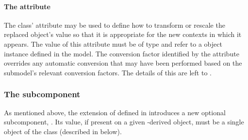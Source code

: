 %


\paragraph{The \fixttspace{} attribute}
\label{replacedelement-conversionfactor}

The \ReplacedElement class'  attribute may be used to
define how to transform or rescale the replaced object's value so that
it is appropriate for the new contexts in which it appears.  The value
of this attribute must be of type  and refer to a
\Parameter object instance defined in the model.  The conversion factor
identified by the  attribute overrides any
automatic conversion that may have been performed based on the
submodel's relevant conversion factors.  The details of this are left to
.


\subsubsection{The \fixttspace{} subcomponent}

As mentioned above, the extension of \SBase defined in
 introduces a new optional subcomponent,
.  Its value, if present on a given \SBase-derived
object, must be a single object of the \ReplacedBy class (described in
 below).


